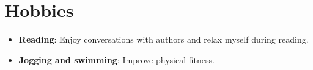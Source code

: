 \documentclass[letterpaper,11pt]{article}
\newcommand{\resumeItem}[2]{
  \item\small{
    \textbf{#1}{: #2 \vspace{-2pt}}
  }
}
\newcommand{\resumeSubItem}[2]{\resumeItem{#1}{#2}\vspace{-4pt}}
\newcommand{\resumeSubHeadingListStart}{\begin{itemize}[leftmargin=*]}
\newcommand{\resumeSubHeadingListEnd}{\end{itemize}}
\begin{document}
\section{Hobbies}
 \resumeSubHeadingListStart
   \resumeSubItem{Reading}
   {Enjoy conversations with authors and relax myself during reading.}
   \resumeSubItem{Jogging and swimming} 
   {Improve physical fitness. }
 \resumeSubHeadingListEnd


\end{document}
